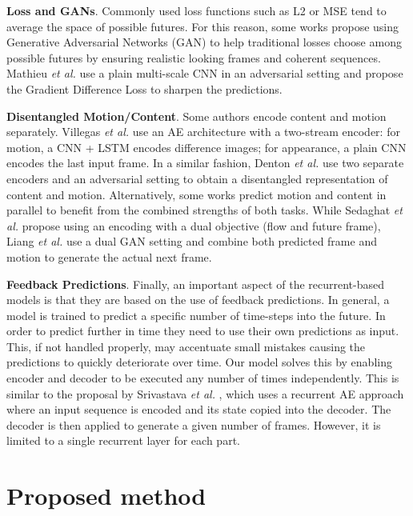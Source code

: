 \documentclass[runningheads]{llncs}
\begin{document}
\textbf{Loss and GANs}. Commonly used loss functions such as L2 or MSE tend to average the space of possible futures. For this reason, some works\cite{mathieu2015deep,villegas2017decomposing,walker2017pose,liang2017dual} propose using Generative Adversarial Networks (GAN) \cite{goodfellow2014gan} to help traditional losses choose among possible futures by ensuring realistic looking frames and coherent sequences. Mathieu \emph{et al.} \cite{mathieu2015deep} use a plain multi-scale CNN in an adversarial setting and propose the Gradient Difference Loss to sharpen the predictions.

\textbf{Disentangled Motion/Content}. Some authors encode content and motion separately. Villegas \emph{et al.} \cite{villegas2017decomposing} use an AE architecture with a two-stream encoder: for motion, a CNN + LSTM encodes difference images; for appearance, a plain CNN encodes the last input frame. In a similar fashion, Denton \emph{et al.} \cite{denton2017disentangled} use two separate encoders and an adversarial setting to obtain a disentangled representation of content and motion. Alternatively, some works predict motion and content in parallel to benefit from the combined strengths of both tasks. While Sedaghat \emph{et al.} \cite{sedaghat2016hybrid} propose using an encoding with a dual objective (flow and future frame), Liang \emph{et al.} \cite{liang2017dual} use a dual GAN setting and combine both predicted frame and motion to generate the actual next frame.

\textbf{Feedback Predictions}. Finally, an important aspect of the recurrent-based models is that they are based on the use of feedback predictions. In general, a model is trained to predict a specific number of time-steps into the future. In order to predict further in time they need to use their own predictions as input. This, if not handled properly, may accentuate small mistakes causing the predictions to quickly deteriorate over time. Our model solves this by enabling encoder and decoder to be executed any number of times independently. This is similar to the proposal by Srivastava \emph{et al.} \cite{srivastava2015unsupervised}, which uses a recurrent AE approach where an input sequence is encoded and its state copied into the decoder. The decoder is then applied to generate a given number of frames. However, it is limited to a single recurrent layer for each part.




\section{Proposed method}
\label{sec:method}
\end{document}
